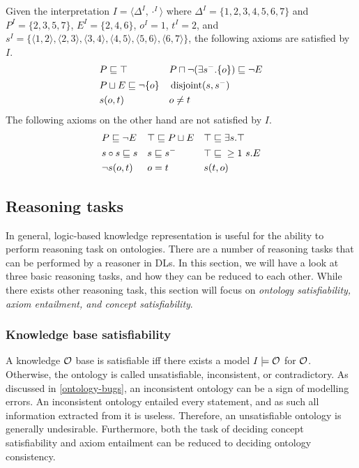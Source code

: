 \begin{example}
  Given the interpretation $I = \langle \Delta^I, \cdot^I \rangle$ where $\Delta^I = \{ 1, 2, 3, 4, 5, 6, 7 \}$ and $P^I = \{ 2, 3, 5, 7 \}$, $E^I = \{ 2, 4, 6 \}$, $o^I = 1$, $t^I = 2$, and $s^I = \{ \langle 1, 2 \rangle,\allowbreak \langle 2, 3 \rangle,\allowbreak \langle 3, 4 \rangle,\allowbreak \langle 4, 5 \rangle,\allowbreak \langle 5, 6 \rangle,\allowbreak \langle 6, 7 \rangle \}$, the following axioms are satisfied by $I$.
  \begin{align*}
    &P \sqsubseteq \top &
    &P \sqcap \lnot (\exists s^-.\{o\}) \sqsubseteq \lnot E \\
    &P \sqcup E \sqsubseteq \lnot \{o\} &
    &\operatorname{disjoint}(s, s^-) \\
    &s(o, t) &
    &o \not= t
  \end{align*}
  The following axioms on the other hand are not satisfied by $I$.
  \begin{align*}
    &P \sqsubseteq \lnot E &
    &\top \sqsubseteq P \sqcup E &
    &\top \sqsubseteq \exists s.\top \\
    &s \circ s \sqsubseteq s &
    &s \sqsubseteq s^- &
    &\top \sqsubseteq{} \geq 1~s.E \\
    &\lnot s(o, t) &
    &o = t &
    &s(t, o)
  \end{align*}
\end{example}

\subsection{Reasoning tasks} \label{reasoning-tasks}

In general, logic-based knowledge representation is useful for the ability to perform reasoning task on ontologies. There are a number of reasoning tasks that can be performed by a reasoner in DLs. In this section, we will have a look at three basic reasoning tasks, and how they can be reduced to each other. While there exists other reasoning task, this section will focus on \emph{ontology satisfiability,} \emph{axiom entailment, and concept satisfiability}.

\subsubsection{Knowledge base satisfiability} \label{knowledge-base-satisfiability}

A knowledge $\mathcal{O}$ base is satisfiable iff there exists a model $I \models \mathcal{O}$ for $\mathcal{O}$. Otherwise, the ontology is called unsatisfiable, inconsistent, or contradictory. As discussed in \cref{ontology-bugs}, an inconsistent ontology can be a sign of modelling errors. An inconsistent ontology entailed every statement, and as such all information extracted from it is useless. Therefore, an unsatisfiable ontology is generally undesirable. Furthermore, both the task of deciding concept satisfiability and axiom entailment can be reduced to deciding ontology consistency.

